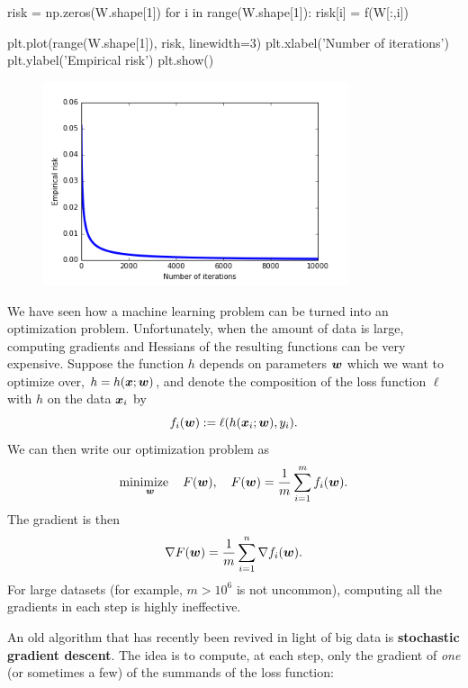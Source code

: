 \begin{example}
\begin{ipythonnb}
risk = np.zeros(W.shape[1])
for i in range(W.shape[1]):
    risk[i] = f(W[:,i])
    
plt.plot(range(W.shape[1]), risk, linewidth=3)
plt.xlabel('Number of iterations')
plt.ylabel('Empirical risk')
plt.show()
\end{ipythonnb}

\begin{figure}[h!]
\centering
\includegraphics[width=0.8\textwidth]{images/iterrisk.png}
\end{figure}
\end{example}

We have seen how a machine learning problem can be turned into an optimization problem. Unfortunately, when the amount of data is large, computing gradients and Hessians of the resulting functions can be very expensive. Suppose the function $h$ depends on parameters $\bm{w}$ which we want to optimize over, $h=h(\bm{x}; \bm{w})$, and denote the composition of the loss function $\ell$ with $h$ on the data $\bm{x}_i$ by
\begin{equation*}
  f_i(\bm{w}) := \ell(h(\bm{x}_i; \bm{w}),y_i).
\end{equation*}
We can then write our optimization problem as
\begin{equation*}
  \mathop{\text{minimize}\quad}_{\bm{w}} F(\bm{w}), \quad F(\bm{w}) = \frac{1}{m} \sum_{i=1}^m f_i(\bm{w}).
\end{equation*}
The gradient is then
\begin{equation*}
  \nabla F(\bm{w}) = \frac{1}{m} \sum_{i=1}^n \nabla f_i(\bm{w}).
\end{equation*}
For large datasets (for example, $m>10^6$ is not uncommon), computing all the gradients in each step is highly ineffective.

An old algorithm that has recently been revived in light of big data is \textbf{stochastic gradient descent}. The idea is to compute, at each step, only the gradient of {\em one} (or sometimes a few) of the summands of the loss function:

